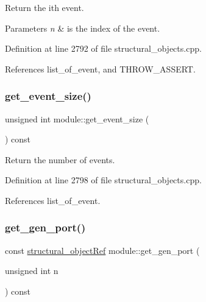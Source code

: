 Return the ith event. 


\begin{DoxyParams}{Parameters}
{\em n} & is the index of the event. \\
\hline
\end{DoxyParams}


Definition at line 2792 of file structural\+\_\+objects.\+cpp.



References list\+\_\+of\+\_\+event, and T\+H\+R\+O\+W\+\_\+\+A\+S\+S\+E\+RT.

\mbox{\label{classmodule_a80d69c7772202adc1847e20198473f0c}} 
\subsubsection{\texorpdfstring{get\+\_\+event\+\_\+size()}{get\_event\_size()}}
{\footnotesize\ttfamily unsigned int module\+::get\+\_\+event\+\_\+size (\begin{DoxyParamCaption}{ }\end{DoxyParamCaption}) const}



Return the number of events. 



Definition at line 2798 of file structural\+\_\+objects.\+cpp.



References list\+\_\+of\+\_\+event.

\mbox{\label{classmodule_aa5c197d6bc4ebaac479f48b03cef4388}} 
\subsubsection{\texorpdfstring{get\+\_\+gen\+\_\+port()}{get\_gen\_port()}}
{\footnotesize\ttfamily const \hyperlink{structural__objects_8hpp_a8ea5f8cc50ab8f4c31e2751074ff60b2}{structural\+\_\+object\+Ref} module\+::get\+\_\+gen\+\_\+port (\begin{DoxyParamCaption}\item[{unsigned int}]{n }\end{DoxyParamCaption}) const}



